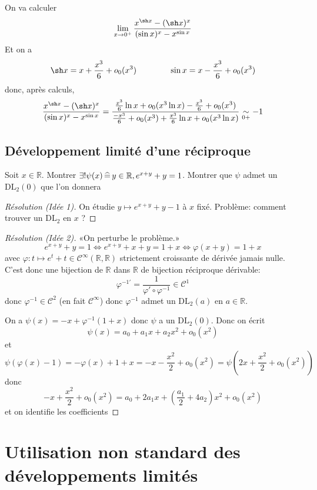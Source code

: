 On va calculer \[
    \lim_{x\to 0^+}\frac{x^{\sh x}-(\sh x)^x}{(\sin x)^x-x^{\sin x}}
\]
Et on a \[
    \sh x=x+\frac{x^3}6+o_0(x^3)\qquad\qquad \sin x=x-\frac{x^3}6+o_0(x^3)
\]
donc, après calculs, \[
    \frac{x^{\sh x}-(\sh x)^x}{(\sin x)^x-x^{\sin x}} = \frac{\frac{x^3}6\ln x+o_0(x^3\ln x)-\frac{x^3}6+o_0(x^3)}{\frac{-x^3}6+o_0(x^3)+\frac{x^3}6\ln x+o_0(x^3\ln x)}\underset{0+}\sim -1
\]

\subsection{Développement limité d'une réciproque}

\begin{exo}
    Soit $x\in\mathbb R$. Montrer $\exists!\psi(x)\,\widehat=\, y\in\mathbb R, e^{x+y}+y=1$. Montrer que $\psi$ admet un $\mathrm{DL}_2(0)$ que l'on donnera
\end{exo}

\begin{proof}[Résolution (Idée 1)]
    On étudie $y\longmapsto e^{x+y}+y-1$ à $x$ fixé. Problème: comment trouver un $\mathrm{DL}_2$ en $x$ ?
\end{proof}

\begin{proof}[Résolution (Idée 2)]
    «On perturbe le problème.» \[
        e^{x+y}+y=1\iff e^{x+y}+x+y=1+x \iff \varphi(x+y)=1+x
    \]
    avec $\varphi: t\longmapsto e^t+t\in\mathcal C^{\infty}(\mathbb R, \mathbb R)$ strictement croissante de dérivée jamais nulle. C'est donc une bijection de $\mathbb R$ dans $\mathbb R$ de bijection réciproque dérivable: \[
        \varphi^{-1'}=\frac1{\varphi'\circ \varphi^{-1}}\in\mathcal C^1
    \]
    donc $\varphi^{-1}\in\mathcal C^2$ (en fait $\mathcal C^{\infty}$) donc $\varphi^{-1}$ admet un $\mathrm{DL}_2(a)$ en $a\in\mathbb R$.

    On a $\psi(x)=-x+\varphi^{-1}(1+x)$ donc $\psi$ a un $\mathrm{DL}_2(0)$. Donc on écrit \[
        \psi(x)=a_0+a_1x+a_2x^2+o_0(x^2)
    \]
    et \[\psi(\varphi(x)-1)=-\varphi(x)+1+x=-x-\frac{x^2}2+o_0(x^2)=\psi \left(2x+\frac{x^2}2+o_0(x^2)\right)\]
    donc \[
        -x+\frac{x^2}2+o_0(x^2)=a_0+2a_1x+\left(\frac{a_1}2+4a_2\right)x^2+o_0(x^2)
    \]
    et on identifie les coefficients
\end{proof}

\section{Utilisation non standard des développements limités}

